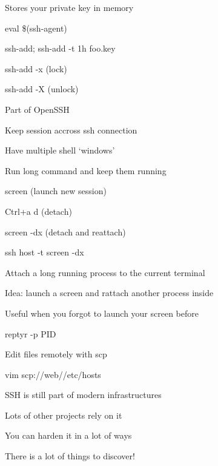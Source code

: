 \begin{iframe}
\item Stores your private key in memory
\item eval \$(ssh-agent)
\item ssh-add; ssh-add -t 1h foo.key
\item ssh-add -x (lock)
\item ssh-add -X (unlock)
\item Part of OpenSSH
\end{iframe}
\begin{iframe}[screen]
\item Keep session accross ssh connection
\item Have multiple shell `windows'
\item Run long command and keep them running
\item screen (launch new session)
\item Ctrl+a d (detach)
\item screen -dx (detach and reattach)
\item ssh host -t screen -dx
\end{iframe}
\begin{iframe}[reptyr]
\item Attach a long running process to the current terminal
\item Idea: launch a screen and rattach another process inside
\item Useful when you forgot to launch your screen before
\item reptyr -p PID
\end{iframe}

\begin{iframe}[vim]
\item Edit files remotely with scp
\item vim scp://web//etc/hosts
\end{iframe}

\begin{iframe}[Conclusion]
    \item SSH is still part of modern infrastructures
    \item Lots of other projects rely on it
    \item You can harden it in a lot of ways
    \item There is a lot of things to discover!
    \end{iframe}

